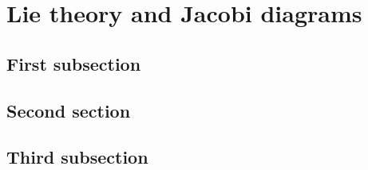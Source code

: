 \chapter{Lie theory and Jacobi diagrams}

\section{First subsection}

\section{Second section}

\section{Third subsection}

